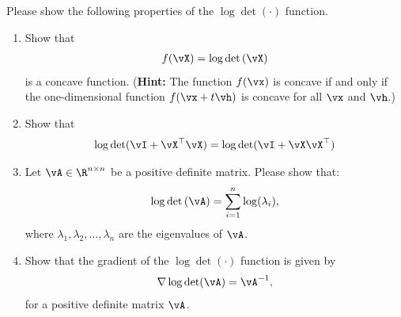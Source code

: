 \documentclass[../../book-main.tex]{subfiles}
\begin{document}
\begin{exercise}
    Please show the following properties of the  $\log\det(\cdot)$ function.
    \begin{enumerate}
        \item Show that
            \begin{align*}
                f(\vX) = \log\det\left(\vX\right)
            \end{align*}
            is a concave function. ({\bf Hint:} The function $f(\vx)$ is
                concave if and only if the one-dimensional function $f(\vx+t\vh)$
            is concave for all $\vx$ and $\vh$.)

        \item Show that
            \begin{align*}
                \log\det(\vI + \vX^\top\vX) = \log\det(\vI + \vX\vX^\top)
            \end{align*}

        \item Let $\vA \in \R^{n\times n}$ be a positive definite matrix.
            Please show that:
            \begin{align}
                \log\det\left(\vA \right) = \sum_{i=1}^n \log(\lambda_i),
            \end{align}
            where $\lambda_1,\lambda_2,\dots,\lambda_n$ are the
            eigenvalues of $\vA$.

        \item  Show that the gradient of the $\log\det(\cdot)$
            function is given by
            \begin{align*}
                \nabla \log\det(\vA) = \vA^{-1},
            \end{align*}
            for a positive definite matrix $\vA$.

    \end{enumerate}

\end{exercise}

\end{document}
